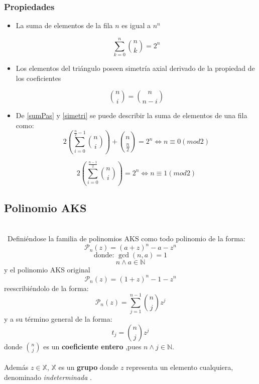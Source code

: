 \documentclass[a4paper, 12pt]{article}
\begin{document}
\subsubsection{Propiedades}

\begin{itemize}
	\item La suma de elementos de la fila $n$ es igual a $n^{n}$
		
		\begin{equation}\label{sumPas}
			\sum_{k=0}^{n}\binom{n}{k} = 2^{n} 
		\end{equation}
	\item Los elementos del triángulo poseen simetría axial derivado de la propiedad de los coeficientes
	
		\begin{equation}\label{simetri}
			\binom{n}{i} = \binom{n}{n-i}
		\end{equation}
	
	\item De \ref{sumPas} y \ref{simetri} se puede describir la suma de elementos de una fila como:	
		 \begin{equation}\label{par}
			 2(\sum_{i = 0}^{\frac{n}{2} -1}\binom{n}{i}) + \binom{n}{\frac{n}{2}} = 2^{n}
			 \iff n \equiv 0 (mod2)
		 \end{equation}
		 
		 \begin{equation}\label{inpar}
		 2(\sum_{i = 0}^{\frac{n-1}{2}}\binom{n}{i})= 2^{n}
		 \iff n \equiv 1 (mod2)
		 \end{equation}
		
		
\end{itemize}

\subsection{Polinomio AKS}\ \\
\
Definiéndose la familia de polinomios AKS como todo polinomio de la forma:
\[ \mathcal{P}_{n}(z) = (a + z)^{n} - a - z^{n} \]
\[\text{donde: } \gcd(n,a) = 1\]
\[n \land a \in \mathbb{N}\]
y el polinomio AKS original \citep[pag. 3]{preAKS} 
\begin{equation}\label{aksorig}
 \mathcal{P}_{n}(z) = (1 + z)^{n} - 1 - z^{n} 
\end{equation}
reescribiéndolo de la forma:
\[ \mathcal{P}_{n}(z) = \sum_{j=1}^{n-1}\binom{n}{j} z^{j} \]
y a su término general de la forma:
\[ t_{j} = \binom{n}{j} z^{j} \]
donde $\binom{n}{j}$ es un \textbf{coeficiente entero} ,pues $n \land j \in \mathbb{N}$.\\
\ \\
Además $z \in \mathbb{X}$, $\mathbb{X}$ es un \textbf{grupo} donde $z$ representa un elemento cualquiera, denominado \emph{indeterminada} \citep[pag. 100]{indeterminate}.
\ \\
\end{document}
